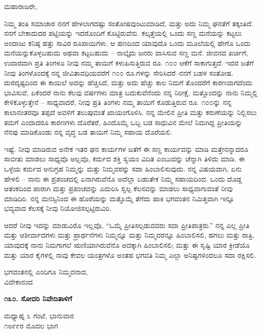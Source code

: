 ಮಹಾರಾಜರೇ,

ನಿಮ್ಮ ತಂತಿ ಸಮಾಚಾರ ನನಗೆ ಹೇಳಲಾಗದಷ್ಟು ಸಂತೋಷವುಂಟುಮಾಡಿದೆ, ಮತ್ತು ಅದು ನಿಮ್ಮ ಘನತೆಗೆ ತಕ್ಕಂತಿದೆ. ನನಗೆ ಬೇಕಾದುದರ ಪಟ್ಟಿಯನ್ನು ಇದರೊಂದಿಗೆ ಕೊಟ್ಟಿರುವೆನು. ಕಲ್ಕತ್ತೆಯಲ್ಲಿ ಒಂದು ಸಣ್ಣ ಮನೆಯನ್ನು ಕಟ್ಟಲು ಅಂದಾಜು ಕನಿಷ್ಠ ಹತ್ತು ಸಾವಿರ ರೂಪಾಯಿಗಳು. ಆ ಹಣದಿಂದ ಯಾವುದೊ ಒಂದು ಮೂಲೆಯಲ್ಲಿ ಹೇಗೊ ಒಂದು ಮನೆಯನ್ನುಕೊಳ್ಳಬಹುದು ಅಥವಾ ಕಟ್ಟಬಹುದು – ನಾಲ್ಕೈದು ಜನರು ವಾಸಿಸುವ ಸಣ್ಣ ಮನೆ. ಜೀವನದ ಖರ್ಚಿಗೆ, ಉದಾರವಾಗಿ ಪ್ರತಿ ತಿಂಗಳೂ ನೀವು ನಮ್ಮ ತಾಯಿಗೆ ಕಳುಹಿಸುತ್ತಿರುವ ರೂ. ೧೦೦ ಆಕೆಗೆ ಸಾಕಾಗುತ್ತದೆ. ಇದರ ಜತೆಗೆ ನೀವು ತಿಂಗಳೊಂದಕ್ಕೆ ನನ್ನ ಜೀವಿತಾವಧಿಯವರೆಗೆ ೧೦೦ ರೂ.ಗಳನ್ನು ಸೇರಿಸಿದರೆ–ನನಗೆ ಬಹಳ ಸಂತೋಷ. ದುರದೃಷ್ಟದಿಂದ ಈ ಕಾಯಿಲೆ ಅದನ್ನು ಹೆಚ್ಚಿಸಿದೆ, ಮತ್ತು ಅದು ಹೆಚ್ಚು ಕಾಲ ನಿಮಗೆ ತೊಂದರೆಗೆ ಕಾರಣವಾಗದೆಂದು ಭಾವಿಸುವೆ, ಏಕೆಂದರೆ ನಾನು ಕೆಲವು ವರ್ಷಗಳು ಮಾತ್ರ ಬದುಕುವೆನೆಂದು ನನ್ನ ನಿರೀಕ್ಷೆ. ಮತ್ತೊಂದನ್ನು ನಾನು ನಿಮ್ಮಲ್ಲಿ ಕೇಳಿಕೊಳ್ಳುತ್ತೇನೆ – ಸಾಧ್ಯವಾದರೆ, ನೀವು ಪ್ರತಿ ತಿಂಗಳು ನಮ್ಮ ತಾಯಿಗೆ ಕೊಡುತ್ತಿರುವ ರೂ. ೧೦೦ನ್ನು ನನ್ನ ಕಾಲಾನಂತರವೂ ತಪ್ಪದೆ ಅವಳಿಗೆ ತಲುಪುವಂತೆ ಖಾಯಂಗೊಳಿಸಿ. ನನ್ನ ಮೇಲಿನ ಪ್ರೀತಿ ಮತ್ತು ಕರುಣೆಯನ್ನು ನಿಲ್ಲಿಸಲು ತಮಗೆ ಎಂದಾದರೂ ಕಾರಣಗಳು ದೊರೆತರೆ, ಹಿಂದೊಮ್ಮೆ ಒಬ್ಬ ಬಡ ಸಾಧುವಿನ ಮೇಲೆ ನಿಮಗಿದ್ದ ಪ್ರೀತಿಯನ್ನು ನೆನಪು ಮಾಡಿಕೊಂಡು ನನ್ನ ವೃದ್ಧ ಬಡ ತಾಯಿಗೆ ನಿಮ್ಮ ಸಹಾಯ ದೊರೆಯಲಿ.

ಇಷ್ಟೆ. ನೀವು ಮಾಡಿರುವ ಅನೇಕ ಇತರ ಘನ ಕಾರ್ಯಗಳ ಜತೆಗೆ ಈ ಸಣ್ಣ ಕಾರ್ಯವನ್ನು ಮಾಡಿ ಮತ್ತೇನನ್ನಾದರೂ ಸಾಬೀತು ಮಾಡಲು ಸಾಧ್ಯವೊ ಅಲ್ಲವೊ, ಕರ್ಮದ ಶಕ್ತಿ ಸ್ವಯಂ ವಿದಿತ ಎಂಬುದನ್ನು ಚೆನ್ನಾಗಿ ತಿಳಿದು ಮಾಡಿ. ಈ ಒಳ್ಳೆಯ ಕರ್ಮದ ಅನುಗ್ರಹ ನಿಮ್ಮನ್ನು ಮತ್ತು ನಿಮ್ಮವರನ್ನು ಸದಾ ಹಿಂಬಾಲಿಸುವುದು. ನನ್ನ ವಿಷಯವಾಗಿ, ಏನು ಹೇಳಲಿ – ನಾನು ಈ ಪ್ರಪಂಚದಲ್ಲಿ ಏನಾಗಿರುವೆನೊ ಅದೆಲ್ಲಾ ಬಹುತೇಕ ನಿಮ್ಮ ಸಹಾಯದಿಂದ. ಒಂದು ದೊಡ್ಡ ಆತಂಕದಿಂದ ಪಾರಾಗಿ ಮತ್ತು ಪ್ರಪಂಚವನ್ನು ಎದುರಿಸಿ ಸ್ವಲ್ಪ ಕೆಲಸವನ್ನು ಮಾಡಲು ಸಾಧ್ಯವಾಗುವಂತೆ ನೀವು ಮಾಡಿದಿರಿ. ನನ್ನ ಮನಸ್ಸಿನಿಂದ ಈ ಹೊರೆಯನ್ನು ಮತ್ತೊಮ್ಮೆ ತೆಗೆದು ಹಾಕಿ ಭಗವಂತನ ನಿಮಿತ್ತವಾಗಿ ಇನ್ನೂ ಭವ್ಯವಾದ ಕೆಲಸಕ್ಕೆ ನೀವು ನಿಯೋಜಿಸಲ್ಪಟ್ಟಿರುವಿರಿ.

ಆದರೆ ನೀವು ಇದನ್ನು ಮಾಡುವಿರೊ ಇಲ್ಲವೊ, “ಒಮ್ಮೆ ಪ್ರೀತಿಸಲ್ಪಡುವವರು ಸದಾ ಪ್ರೀತಿಪಾತ್ರರು.” ನನ್ನ ಎಲ್ಲ ಪ್ರೀತಿ ಮತ್ತು ಆಶೀರ್ವಾದಗಳು ಮತ್ತು ಪ್ರಾರ್ಥನೆಗಳು ನಿಮ್ಮನ್ನೂ ಮತ್ತು ನಿಮ್ಮವರನ್ನೂ ಹಿಂಬಾಲಿಸಲಿ, ಹಗಲು ಮತ್ತು ರಾತ್ರಿ, ಯಾವುದಕ್ಕೆ ನಾನು ನಿಮಗಾಗಲೆ ಋಣಿಯಾಗಿರುವೆನೊ ಅದಕ್ಕಾಗಿ ಹಿಂಬಾಲಿಸಲಿ; ಮತ್ತು ಈ ಸೃಷ್ಟಿ ಯಾರ ಕ್ರೀಡೆಯೊ ಮತ್ತು ಯಾರ ಕೈಗಳಲ್ಲಿ ನಾವು ಕೇವಲ ಯಂತ್ರಗಳೊ ಅಂತಹ ಭಗವತಿ ನಿಮ್ಮ ಎಲ್ಲಾ ಅನಿಷ್ಟಗಳಿಂದಲೂ ಸದಾ ರಕ್ಷಿಸಲಿ.

\begin{flushright}
ಭಗವಂತನಲ್ಲಿ ಎಂದಿಗೂ ನಿಮ್ಮವನಾದ,\\ವಿವೇಕಾನಂದ
\end{flushright}

\begin{center}
\textbf{೧೩೦. ಸೋದರಿ ನಿವೇದಿತಾಳಿಗೆ}
\end{center}

\begin{flushright}
ಮಧ್ಯಾಹ್ನ ೩ ಗಂಟೆ, ಭಾನುವಾರ\\೧೮೯೯ರ ಮೊದಲ ಭಾಗ
\end{flushright}

